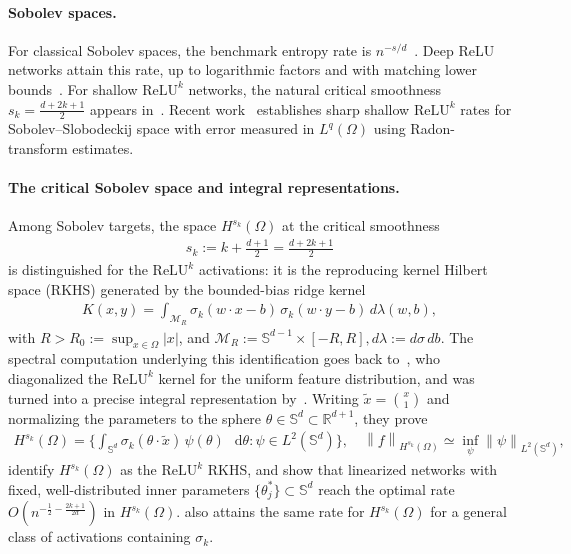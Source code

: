 \documentclass[12pt]{article}
\numberwithin{equation}{section}
\numberwithin{figure}{section}
\numberwithin{equation}{section}
\newcommand{\R}{\mathbb{R}}
\newcommand{\Sph}{\mathbb S}
\newcommand{\MR}{\mathcal M_R}
\newcommand{\dd}{\mathop{}\!\mathrm{d}}
\newcommand{\norm}[1]{\left\|#1\right\|}
\newcommand{\abs}[1]{\left|#1\right|}
\begin{document}
\paragraph{Sobolev spaces.}
For classical Sobolev spaces, the benchmark entropy rate is
$n^{-s/d}$~\cite{devore_nonlinearapproximation_1998,
devore_OptimalNonlinearApproximation_1989,pinkus_NWidthsApproximationTheory_1985,
edmunds_FunctionSpacesEntropy_1996}.
Deep ReLU networks attain this rate, up to logarithmic factors and with
matching lower bounds~\cite{siegel_optimalapproximationrates_2023,
yang_optimalapproximationsobolev_2025}. For shallow $\mathrm{ReLU}^k$ networks, 
the natural critical smoothness $s_k = \frac{d+2k+1}{2}$
appears in~\cite{siegel_sharpboundsapproximation_2024,
yang_OptimalRatesApproximation_2025}.
Recent work~\cite{mao_ApproximationRatesShallow_2026} establishes sharp shallow
$\mathrm{ReLU}^k$ rates for Sobolev--Slobodeckij space with
error measured in $L^q(\Omega)$ using Radon-transform estimates.

\paragraph{The critical Sobolev space and integral representations.}
Among Sobolev targets, the space $H^{s_k}(\Omega)$ at the critical smoothness
\begin{align*}
    s_k := k+\frac{d+1}{2}=\frac{d+2k+1}{2}
\end{align*}
is distinguished for the $\mathrm{ReLU}^k$ activations: it is the reproducing
kernel Hilbert space (RKHS) generated by the bounded-bias ridge kernel
\begin{align*}
    K(x,y)=\int_{\MR}\sigma_k(w\cdot x-b)\,\sigma_k(w\cdot y-b)\,d\lambda(w,b),
\end{align*}
with $R>R_0:= \sup_{x\in\Omega}\abs{x}$, and $\MR:=\Sph^{d-1}\times[-R,R], d\lambda:=d\sigma\,db$.
 The spectral computation underlying this
identification goes back to~\cite{bach_breakingcursedimensionality_2017},
who diagonalized the $\mathrm{ReLU}^k$ kernel for the uniform feature
distribution, and was turned into a precise integral representation by~\cite{liu_integralrepresentationssobolev_2025}. Writing
$\tilde x=\binom{x}{1}$ and normalizing the parameters to the sphere
$\theta\in\Sph^{d}\subset\R^{d+1}$, they prove
\begin{align}
    H^{s_k}(\Omega)
    = \Big\{ \int_{\Sph^{d}}\sigma_k(\theta\cdot\tilde x)\,\psi(\theta)\,\dd\theta
    : \psi\in L^2(\Sph^{d}) \Big\},
    \quad
    \norm{f}_{H^{s_k}(\Omega)}\simeq\inf_{\psi}\norm{\psi}_{L^2(\Sph^{d})},
    \label{eq:LMX-representation}
\end{align}
identify $H^{s_k}(\Omega)$ as the $\mathrm{ReLU}^k$ RKHS, and show that
linearized networks with fixed, well-distributed inner parameters
$\{\theta_j^*\}\subset\Sph^{d}$ reach the optimal rate
$O(n^{-\frac12-\frac{2k+1}{2d}})$ in $H^{s_k}(\Omega)$.
\cite{petrushev_approximationridgefunctions_1998} also attains the same rate for
$H^{s_k}(\Omega)$ for a general class of activations containing $\sigma_k$.
\end{document}
